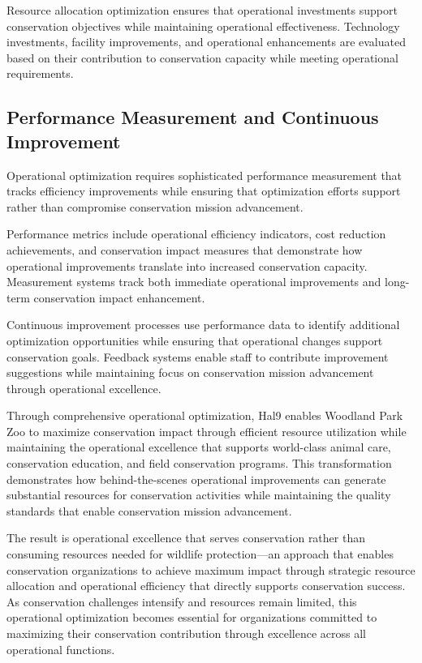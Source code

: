 \documentclass[
  Letterpaper,
]{scrbook}
\begin{document}
Resource allocation optimization ensures that operational investments
support conservation objectives while maintaining operational
effectiveness. Technology investments, facility improvements, and
operational enhancements are evaluated based on their contribution to
conservation capacity while meeting operational requirements.

\subsection{Performance Measurement and Continuous
Improvement}\label{performance-measurement-and-continuous-improvement}

Operational optimization requires sophisticated performance measurement
that tracks efficiency improvements while ensuring that optimization
efforts support rather than compromise conservation mission advancement.

Performance metrics include operational efficiency indicators, cost
reduction achievements, and conservation impact measures that
demonstrate how operational improvements translate into increased
conservation capacity. Measurement systems track both immediate
operational improvements and long-term conservation impact enhancement.

Continuous improvement processes use performance data to identify
additional optimization opportunities while ensuring that operational
changes support conservation goals. Feedback systems enable staff to
contribute improvement suggestions while maintaining focus on
conservation mission advancement through operational excellence.

Through comprehensive operational optimization, Hal9 enables Woodland
Park Zoo to maximize conservation impact through efficient resource
utilization while maintaining the operational excellence that supports
world-class animal care, conservation education, and field conservation
programs. This transformation demonstrates how behind-the-scenes
operational improvements can generate substantial resources for
conservation activities while maintaining the quality standards that
enable conservation mission advancement.

The result is operational excellence that serves conservation rather
than consuming resources needed for wildlife protection---an approach
that enables conservation organizations to achieve maximum impact
through strategic resource allocation and operational efficiency that
directly supports conservation success. As conservation challenges
intensify and resources remain limited, this operational optimization
becomes essential for organizations committed to maximizing their
conservation contribution through excellence across all operational
functions.
\end{document}
